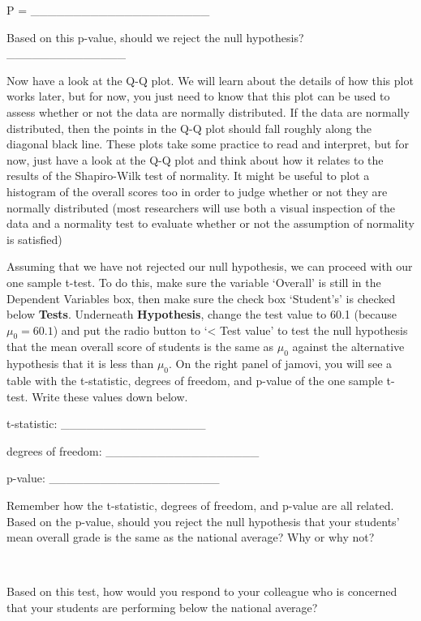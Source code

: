 \documentclass[
  openany]{krantz}
\begin{document}
P = \_\_\_\_\_\_\_\_\_\_\_\_\_\_\_\_\_\_\_\_\_

Based on this p-value, should we reject the null hypothesis? \_\_\_\_\_\_\_\_\_\_\_\_\_\_

Now have a look at the Q-Q plot.
We will learn about the details of how this plot works later, but for now, you just need to know that this plot can be used to assess whether or not the data are normally distributed.
If the data are normally distributed, then the points in the Q-Q plot should fall roughly along the diagonal black line.
These plots take some practice to read and interpret, but for now, just have a look at the Q-Q plot and think about how it relates to the results of the Shapiro-Wilk test of normality.
It might be useful to plot a histogram of the overall scores too in order to judge whether or not they are normally distributed (most researchers will use both a visual inspection of the data and a normality test to evaluate whether or not the assumption of normality is satisfied)

Assuming that we have not rejected our null hypothesis, we can proceed with our one sample t-test.
To do this, make sure the variable `Overall' is still in the Dependent Variables box, then make sure the check box `Student's' is checked below \textbf{Tests}.
Underneath \textbf{Hypothesis}, change the test value to 60.1 (because \(\mu_{0} = 60.1\)) and put the radio button to `\textless{} Test value' to test the null hypothesis that the mean overall score of students is the same as \(\mu_{0}\) against the alternative hypothesis that it is less than \(\mu_{0}\).
On the right panel of jamovi, you will see a table with the t-statistic, degrees of freedom, and p-value of the one sample t-test.
Write these values down below.

t-statistic: \_\_\_\_\_\_\_\_\_\_\_\_\_\_\_\_\_

degrees of freedom: \_\_\_\_\_\_\_\_\_\_\_\_\_\_\_\_\_\_

p-value: \_\_\_\_\_\_\_\_\_\_\_\_\_\_\_\_\_\_\_\_

Remember how the t-statistic, degrees of freedom, and p-value are all related.
Based on the p-value, should you reject the null hypothesis that your students' mean overall grade is the same as the national average?
Why or why not?

\begin{verbatim}


\end{verbatim}

Based on this test, how would you respond to your colleague who is concerned that your students are performing below the national average?
\end{document}
